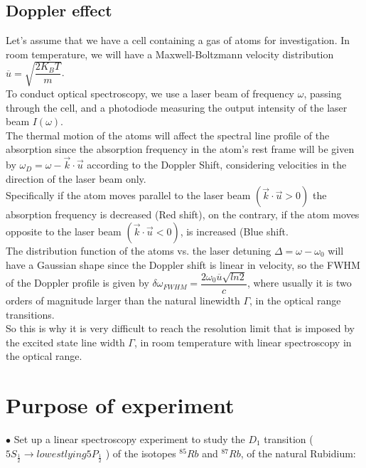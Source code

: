 \documentclass[openany,11pt,a4paper]{book}
\begin{document}
\subsection{Doppler effect}

Let's assume that we have a cell containing a gas of atoms for investigation. In room temperature, we will have a Maxwell-Boltzmann velocity distribution $\overline{u}= \sqrt{\dfrac{2K_{B}T}{m}}  $.\\

To conduct optical spectroscopy, we use a laser beam of frequency $\omega$, passing through the cell, and a photodiode measuring the output intensity of the laser beam  $I(\omega)$.\\

The thermal motion of the atoms will affect the spectral line profile of the absorption since the absorption frequency in the atom's rest frame will be given by $\omega_{D}= \omega - \vec{k}\cdot \vec{u}$ according to the Doppler Shift, considering velocities in the direction of the laser beam only.\\

Specifically if the atom moves parallel to the laser beam $(\vec{k}\cdot \vec{u} > 0)$ the absorption frequency is decreased (Red shift), on the contrary, if the atom moves opposite to the laser beam  $(\vec{k}\cdot \vec{u} < 0)$, is increased (Blue shift.\\

The distribution function of the atoms vs. the laser detuning $\Delta = \omega -\omega_{0}$ will have a Gaussian shape since the Doppler shift is linear in velocity, so the FWHM of the Doppler profile is given by $\delta\omega_{FWHM}= \dfrac{2 \omega_{0} \overline{u} \sqrt{ln2}}{c}  $, where usually it is two orders of magnitude larger than the natural linewidth $\Gamma$, in the optical range transitions.\\

So this is why it is very difficult to reach the resolution limit that is imposed by the excited state line width $\Gamma$, in room temperature with linear spectroscopy in the optical range.






\section*{Purpose of experiment}


$\bullet $ Set up a linear spectroscopy experiment to study the $D_{1}$ transition ($5 S_{\frac{1}{2}} \rightarrow lowest lying 5 P_{\frac{1}{2}}$  ) of the isotopes $^{85}Rb$ and $^{87}Rb$, of the natural Rubidium:\\ 
\end{document}
